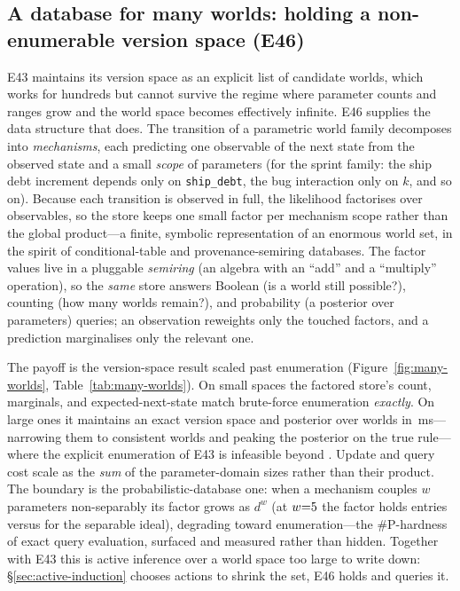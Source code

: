 \documentclass[11pt]{article}
\begin{document}
\subsection{A database for many worlds: holding a non-enumerable version space (E46)}\label{sec:many-worlds}
E43 maintains its version space as an explicit list of candidate worlds, which
works for hundreds but cannot survive the regime where parameter counts and
ranges grow and the world space becomes effectively infinite. E46 supplies the
data structure that does. The transition of a parametric world family decomposes
into \emph{mechanisms}, each predicting one observable of the next state from the
observed state and a small \emph{scope} of parameters (for the sprint family:
the ship debt increment depends only on \texttt{ship\_debt}, the bug interaction
only on $k$, and so on). Because each transition is observed in full, the
likelihood factorises over observables, so the store keeps one small factor per
mechanism scope rather than the global product---a finite, symbolic
representation of an enormous world set, in the spirit of conditional-table and
provenance-semiring databases. The factor values live in a pluggable \emph{semiring} (an algebra with an
``add'' and a ``multiply'' operation), so the \emph{same} store answers Boolean (is a world still possible?), counting
(how many worlds remain?), and probability (a posterior over parameters)
queries; an observation reweights only the touched factors, and a prediction
marginalises only the relevant one.

The payoff is the version-space result scaled past enumeration
(Figure~\ref{fig:many-worlds}, Table~\ref{tab:many-worlds}). On small spaces the
factored store's count, marginals, and expected-next-state match brute-force
enumeration \emph{exactly}. On large ones it maintains an exact version space and
posterior over \ManyWorldsMax{} worlds in \ManyWorldsMaxMs{}\,ms---narrowing them
to \ManyWorldsConsistent{} consistent worlds and peaking the posterior on the
true rule---where the explicit enumeration of E43 is infeasible beyond
\ManyWorldsEnumMax{}. Update and query cost scale as the \emph{sum} of the
parameter-domain sizes rather than their product. The boundary is the
probabilistic-database one: when a mechanism couples $w$ parameters
non-separably its factor grows as $d^{w}$ (at $w{=}5$ the
factor holds \ManyWorldsCoupleFactor{} entries versus \ManyWorldsCoupleIdeal{}
for the separable ideal), degrading toward enumeration---the $\#$P-hardness of
exact query evaluation, surfaced and measured rather than hidden. Together with
E43 this is active inference over a world space too large to write down:
\S\ref{sec:active-induction} chooses actions to shrink the set, E46 holds and
queries it.
\end{document}
